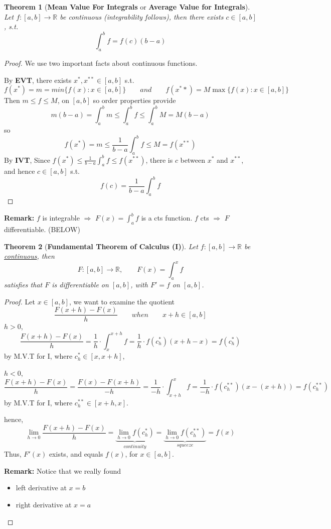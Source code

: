 \documentclass[12pt]{article}
\theoremstyle{plain}
\newtheorem{theorem}{Theorem}[subsection]
\newcommand{\mR}{{\mathbb{R}}}
\begin{document}
	\begin{theorem}[\textbf{Mean Value For Integrals} or \textbf{Average Value
		for Integrals}]
		Let $f:[a,b]\to\mR$ be continuous (integrability follows), then there
		exists $c\in [a,b]$, s.t. 
		\[
			\int_a^b f = f(c) (b-a)
		\]
	\end{theorem}
	\begin{proof}
		We use two important facts about continuous functions. 
		
		By \textbf{EVT}, there exists $x^*, x^{**} \in [a,b]$ s.t.
		\[
			f(x^*) = m = min \{f(x) : x\in [a,b]\} \qquad and \qquad
			f(x^**) = M \max\{f(x) : x \in [a,b]\} 
		\]
		Then $m\leq f\leq M$, on $[a,b]$ so order properties provide
		\[
			m(b-a) =\int_a^b m\leq \int_a^b f \leq \int_a^b M = M(b-a)
		\]
		so 
		\[
			f(x^*) = m\leq \frac1{b-a} \int_a^b f \leq M = f(x^{**})
		\]
		By \textbf{IVT}, Since $f(x^*) \leq \frac1{b-a}\int_a^b f
		\leq f(x^{**})$, there is $c$ between $x^*$ and $x^{**}$, and 
		hence $c\in[a,b]$ s.t. 
		\[
			f(c) = \frac1{b-a} \int_a^b f
		\]
	\end{proof}

	{\color{brown}
	\textbf{Remark:}
	$f$ is integrable $\Rightarrow$ $F(x) = \int_a^b f$ is a cts function. 
	$f$ cts $\Rightarrow$ $F$ differentiable. (BELOW) }\\
		
	\begin{theorem}[\textbf{Fundamental Theorem of Calculus (I)}]
		Let $f:[a,b]\to \mR$ be \underline{continuous}, then 
		\[
			F:[a,b] \to \mR, \qquad F(x) = \int_a^x f
		\]
		satisfies that $F$ is differentiable on $[a,b]$, with $F' = f$ 
		on $[a,b]$.
	\end{theorem}
	\begin{proof}
		Let $x\in[a,b]$, we want to examine the quotient 
		\[
			\frac{F(x+h)-F(x)}h \qquad when \qquad x+h \in [a,b]
		\]
		\underline{$h>0$}, 
		\[
			\frac{F(x+h)-F(x)}h=\frac 1h \cdot \int_x^{x+h} f = 
			\frac1h \cdot f(c_h^*) (x+h-x)=f(c_h^*) 
		\]
		by M.V.T for I, where $c_h^* \in [x, x+h]$, 

		\underline{$h<0$}, 
		\[
			\frac{F(x+h)-F(x)}h = \frac{F(x)-F(x+h)}{-h}
			= \frac1{-h} \cdot \int_{x+h}^x f
			= \frac1{-h}\cdot  f(c_h^{**})(x-(x+h))
			=f(c_h^{**})
		\]
		by M.V.T for I, where $c_h^{**} \in [x + h, x]$. 
			
		hence, 
		\[
			\lim_{h\to 0} \frac{F(x+h)-F(x)}h 
			=\underbrace{\lim_{h\to 0} f(c_h^*)}_{continuity}	
			=\underbrace{\lim_{h\to 0} f(c_h^{**})}_{squeeze}= f(x)
		\]
		Thus, $F'(x)$ exists, and equals $f(x)$, for $x\in [a,b]$. \\
		
		{\color{brown}
		\textbf{Remark:} Notice that we really found 
		\begin{itemize}
			\item left derivative at $x=b$
			\item right derivative at $x=a$
		\end{itemize}}
	\end{proof}
\end{document}
